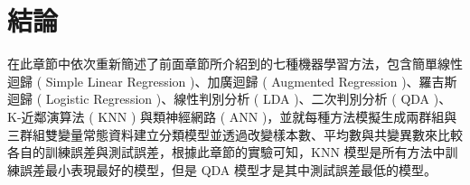 \renewcommand\arraystretch{1.5}
\begin{table}[H]
\scriptsize
\setlength{\belowcaptionskip}{0pt}
\centering
\caption{七種機器學習方法改變群共變異數的三群組測試資料分類錯誤率}\label{tb:hw7variancetest-three}
\end{table}


\section{結論}

在此章節中依次重新簡述了前面章節所介紹到的七種機器學習方法，包含簡單線性迴歸 ( Simple Linear Regression )、加廣迴歸 ( Augmented Regression )、羅吉斯迴歸 ( Logistic Regression )、線性判別分析 ( LDA )、二次判別分析 ( QDA )、K-近鄰演算法 ( KNN ) 與類神經網路 ( ANN )，並就每種方法模擬生成兩群組與三群組雙變量常態資料建立分類模型並透過改變樣本數、平均數與共變異數來比較各自的訓練誤差與測試誤差，根據此章節的實驗可知，KNN 模型是所有方法中訓練誤差最小表現最好的模型，但是 QDA 模型才是其中測試誤差最低的模型。

%